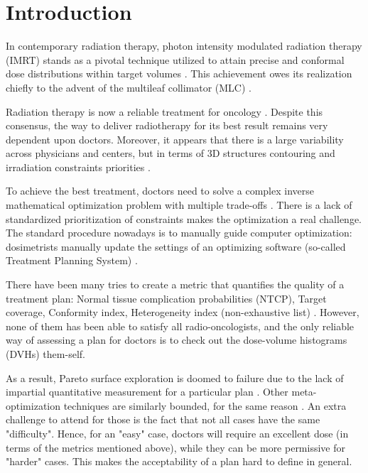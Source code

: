 \section{Introduction}
In contemporary radiation therapy, photon intensity modulated radiation therapy (IMRT) stands as a pivotal technique utilized to attain precise and conformal dose distributions within target volumes \cite{xu_comparison_2017}.
This achievement owes its realization chiefly to the advent of the multileaf collimator (MLC) \cite{galvin_characterization_1993}.

Radiation therapy is now a reliable treatment for oncology \cite{valentini_survival_2009}.
Despite this consensus, the way to deliver radiotherapy for its best result remains very dependent upon doctors.
Moreover, it appears that there is a large variability across physicians and centers, but in terms of 3D structures contouring and irradiation constraints priorities \cite{variability_2021}.

To achieve the best treatment, doctors need to solve a complex inverse mathematical optimization problem with multiple trade-offs \cite{oelfke_inverse_2001} \cite{webb_physical_2003}.
There is a lack of standardized prioritization of constraints makes the optimization a real challenge.
The standard procedure nowadays is to manually guide computer optimization: dosimetrists manually update the settings of an optimizing software (so-called Treatment Planning System) \cite{planification_website}.

There have been many tries to create a metric that quantifies the quality of a treatment plan: Normal tissue complication probabilities (NTCP), Target coverage, Conformity index, Heterogeneity index (non-exhaustive list) \cite{lyman_normal_1992} \cite{li_input_2022}.\label{metrics}
However, none of them has been able to satisfy all radio-oncologists, and the only reliable way of assessing a plan for doctors is to check out the dose-volume histograms (DVHs) them-self.

As a result, Pareto surface exploration is doomed to failure due to the lack of impartial quantitative measurement for a particular plan \cite{huang_pareto_2021}.
Other meta-optimization techniques are similarly bounded, for the same reason \cite{wu_optimization_2001} \cite{xing_optimization_1999}.
An extra challenge to attend for those is the fact that not all cases have the same "difficulty".
Hence, for an "easy" case, doctors will require an excellent dose (in terms of the metrics mentioned above), while they can be more permissive for "harder" cases.
This makes the acceptability of a plan hard to define in general.

